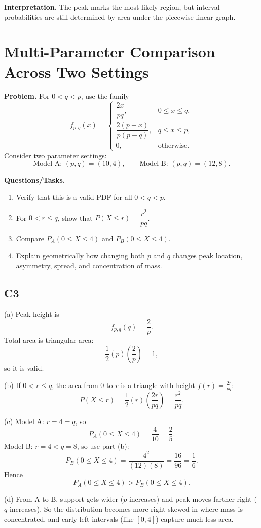\textbf{Interpretation.}
The peak marks the most likely region, but interval probabilities are still determined by area under the piecewise linear graph.

\section{Multi-Parameter Comparison Across Two Settings}

\textbf{Problem.}
For $0<q<p$, use the family
\[
f_{p,q}(x)=\begin{cases}
\dfrac{2x}{pq}, & 0\le x\le q,\\
\dfrac{2(p-x)}{p(p-q)}, & q\le x\le p,\\
0, & \text{otherwise.}
\end{cases}
\]
Consider two parameter settings:
\[
\text{Model A: }(p,q)=(10,4),\qquad \text{Model B: }(p,q)=(12,8).
\]

\textbf{Questions/Tasks.}
\begin{enumerate}[label=(\alph*)]
\item Verify that this is a valid PDF for all $0<q<p$.
\item For $0<r\le q$, show that $P(X\le r)=\dfrac{r^2}{pq}$.
\item Compare $P_A(0\le X\le 4)$ and $P_B(0\le X\le 4)$.
\item Explain geometrically how changing both $p$ and $q$ changes peak location, asymmetry, spread, and concentration of mass.
\end{enumerate}

\subsection*{C3}
(a) Peak height is
\[
f_{p,q}(q)=\frac{2}{p}.
\]
Total area is triangular area:
\[
\frac12(p)\left(\frac{2}{p}\right)=1,
\]
so it is valid.

(b) If $0<r\le q$, the area from $0$ to $r$ is a triangle with height $f(r)=\frac{2r}{pq}$:
\[
P(X\le r)=\frac12(r)\left(\frac{2r}{pq}\right)=\frac{r^2}{pq}.
\]

(c) Model A: $r=4=q$, so
\[
P_A(0\le X\le 4)=\frac{4}{10}=\frac25.
\]
Model B: $r=4<q=8$, so use part (b):
\[
P_B(0\le X\le 4)=\frac{4^2}{(12)(8)}=\frac{16}{96}=\frac16.
\]
Hence
\[
P_A(0\le X\le 4)>P_B(0\le X\le 4).
\]

(d) From A to B, support gets wider ($p$ increases) and peak moves farther right ($q$ increases). So the distribution becomes more right-skewed in where mass is concentrated, and early-left intervals (like $[0,4]$) capture much less area.

